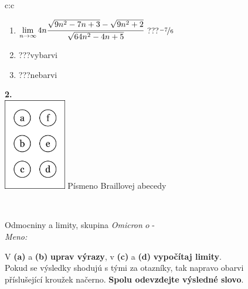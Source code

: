 \documentclass[10pt]{report}
\newcommand\omicron{o}
\begin{document}
\begin{tabular}{c:c}
\begin{minipage}[c][104.5mm][t]{0.5\linewidth}
\begin{center}
\begin{minipage}{0.79\linewidth}
\begin{center}
\begin{varwidth}{\linewidth}
\begin{enumerate}
\item $\lim\limits_{n\to\infty}4n\cfrac{\sqrt{9n^2-7n+3}-\sqrt{9n^2+2}}{\sqrt{64n^2-4n+5}}$\quad \dotfill\; ???\;\dotfill \quad $\nicefrac{-7}{6}$
\item \quad \dotfill\; ???\;\dotfill \quad vybarvi
\item \quad \dotfill\; ???\;\dotfill \quad nebarvi
\end{enumerate}
\end{varwidth}
\end{center}
\end{minipage}
\begin{minipage}{0.20\linewidth}
\begin{center}
{\Huge\bfseries 2.} \\[2mm]
\includegraphics[height=40mm]{../images/braille.png}
{\small Písmeno Braillovej abecedy}
\end{center}
\end{minipage}
\end{center}
\end{minipage}
\\ \hdashline
\begin{minipage}[c][104.5mm][t]{0.5\linewidth}
\begin{center}
\vspace{7mm}
{\huge Odmocniny a limity, skupina \textit{Omicron $\omicron$} -}\\[5mm]
\textit{Meno:}\phantom{xxxxxxxxxxxxxxxxxxxxxxxxxxxxxxxxxxxxxxxxxxxxxxxxxxxxxxxxxxxxxxxxx}\\[5mm]
\begin{minipage}{0.95\linewidth}
\begin{center}
V \textbf{(a)} a \textbf{(b)} \textbf{uprav výrazy}, v \textbf{(c)} a \textbf{(d)} \textbf{vypočítaj limity}.\\Pokud se výsledky shodujú s tými za otazníky, tak napravo obarvi\\příslušející kroužek načerno. \textbf{Spolu odevzdejte výsledné slovo}.
\end{center}
\end{minipage}
\\[1mm]

\end{center}
\end{minipage}
\end{tabular}
\end{document}
